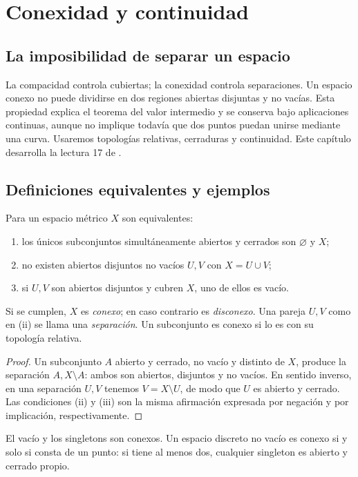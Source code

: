 \chapter{Conexidad y continuidad}\label{chap:17}

\section{La imposibilidad de separar un espacio}
La compacidad controla cubiertas; la conexidad controla separaciones. Un espacio conexo no puede dividirse en dos regiones abiertas disjuntas y no vacías. Esta propiedad explica el teorema del valor intermedio y se conserva bajo aplicaciones continuas, aunque no implique todavía que dos puntos puedan unirse mediante una curva. Usaremos topologías relativas, cerraduras y continuidad. Este capítulo desarrolla la lectura 17 de \cite{valencia}.

\section{Definiciones equivalentes y ejemplos}
\begin{proposicion}\label{ch17:def}
Para un espacio métrico $X$ son equivalentes:
\begin{enumerate}[label=(\roman*)]
\item los únicos subconjuntos simultáneamente abiertos y cerrados son $\varnothing$ y $X$;
\item no existen abiertos disjuntos no vacíos $U,V$ con $X=U\cup V$;
\item si $U,V$ son abiertos disjuntos y cubren $X$, uno de ellos es vacío.
\end{enumerate}
Si se cumplen, $X$ es \emph{conexo}; en caso contrario es \emph{disconexo}. Una pareja $U,V$ como en (ii) se llama una \emph{separación}. Un subconjunto es conexo si lo es con su topología relativa.
\end{proposicion}
\begin{proof}
Un subconjunto $A$ abierto y cerrado, no vacío y distinto de $X$, produce la separación $A,X\setminus A$: ambos son abiertos, disjuntos y no vacíos. En sentido inverso, en una separación $U,V$ tenemos $V=X\setminus U$, de modo que $U$ es abierto y cerrado. Las condiciones (ii) y (iii) son la misma afirmación expresada por negación y por implicación, respectivamente.
\end{proof}
El vacío y los singletons son conexos. Un espacio discreto no vacío es conexo si y solo si consta de un punto: si tiene al menos dos, cualquier singleton es abierto y cerrado propio.

